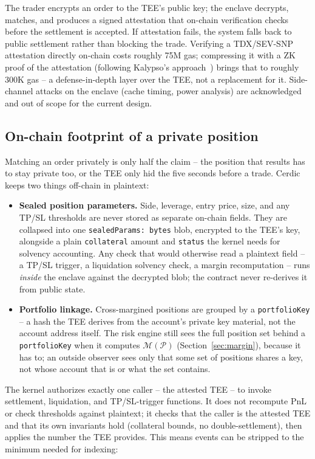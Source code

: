 \documentclass[11pt,a4paper]{article}
\begin{document}
The trader encrypts an order to the TEE's public key; the enclave decrypts, matches, and produces a signed attestation that on-chain verification checks before the settlement is accepted. If attestation fails, the system falls back to public settlement rather than blocking the trade. Verifying a TDX/SEV-SNP attestation directly on-chain costs roughly 75M gas; compressing it with a ZK proof of the attestation (following Kalypso's approach~\cite{marlin_kalypso}) brings that to roughly 300K gas -- a defense-in-depth layer over the TEE, not a replacement for it. Side-channel attacks on the enclave (cache timing, power analysis) are acknowledged and out of scope for the current design.

\subsection{On-chain footprint of a private position}
\label{sec:sealed}

Matching an order privately is only half the claim -- the position that results has to stay private too, or the TEE only hid the five seconds before a trade. Cerdic keeps two things off-chain in plaintext:

\begin{itemize}
  \item \textbf{Sealed position parameters.} Side, leverage, entry price, size, and any TP/SL thresholds are never stored as separate on-chain fields. They are collapsed into one \texttt{sealedParams: bytes} blob, encrypted to the TEE's key, alongside a plain \texttt{collateral} amount and \texttt{status} the kernel needs for solvency accounting. Any check that would otherwise read a plaintext field -- a TP/SL trigger, a liquidation solvency check, a margin recomputation -- runs \emph{inside} the enclave against the decrypted blob; the contract never re-derives it from public state.
  \item \textbf{Portfolio linkage.} Cross-margined positions are grouped by a \texttt{portfolioKey} -- a hash the TEE derives from the account's private key material, not the account address itself. The risk engine still sees the full position set behind a \texttt{portfolioKey} when it computes $\mathcal{M}(\mathcal{P})$ (Section~\ref{sec:margin}), because it has to; an outside observer sees only that some set of positions shares a key, not whose account that is or what the set contains.
\end{itemize}

The kernel authorizes exactly one caller -- the attested TEE -- to invoke settlement, liquidation, and TP/SL-trigger functions. It does not recompute PnL or check thresholds against plaintext; it checks that the caller is the attested TEE and that its own invariants hold (collateral bounds, no double-settlement), then applies the number the TEE provides. This means events can be stripped to the minimum needed for indexing:
\end{document}
